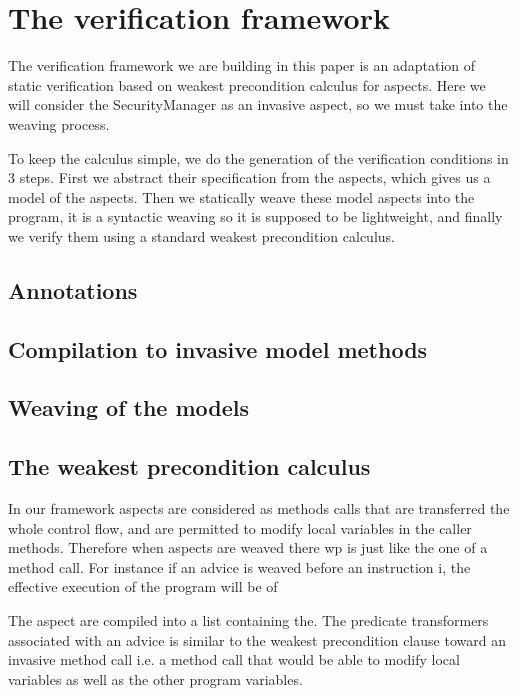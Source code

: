 \documentclass[draft]{llncs}
\begin{document}
\section{The verification framework}
The verification framework we are building in this paper is an adaptation of static
verification based on weakest precondition calculus for aspects. Here we will consider
the SecurityManager as an invasive aspect, so we must take into the weaving process.

To keep the calculus simple, we do the generation of the verification conditions in 3 steps.
First we abstract their specification from the aspects, which gives us a model of the aspects.
Then we statically weave these model aspects into the program, it is a syntactic weaving so
it is supposed to be lightweight, and finally we verify them
using a standard weakest precondition calculus.

\subsection{Annotations}


\subsection{Compilation to invasive model methods}

\subsection{Weaving of the models}


\subsection{The weakest precondition calculus}

In our framework aspects are considered as methods calls that are transferred the whole
control flow, and are permitted to modify local variables in the caller methods. Therefore when aspects are weaved
there wp is just like the one of a method call.
For instance if an advice is weaved before an instruction i, the effective execution of the program
will be of

The aspect are compiled into a list containing the.
The predicate transformers associated with an advice is similar to the weakest precondition
clause toward an invasive method call i.e. a method call that would be able to modify local variables
as well as the other program variables.
\end{document}
